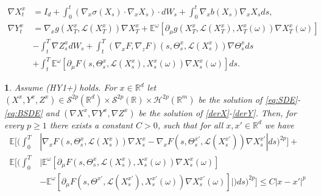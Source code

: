 \documentclass[10pt,a4paper]{amsart}
\newtheorem{lem}{}
\newcommand{\E}{\mathbb E}
\newcommand{\R}{\mathbb R}
\newcommand{\Te}{\Theta}
\newcommand{\cH}{\mathcal H}
\newcommand{\cL}{\mathcal L}
\newcommand{\cS}{\mathcal S}
\newcommand{\om}{\omega}
\newcommand{\si}{\sigma}
\begin{document}
\begin{align}\label{derX}
  \nabla X^x_t&=I_d+\int_0^t(\nabla_x\si(X_s)\cdot\nabla_xX_s)\cdot dW_s+\int_0^t\nabla_xb(X_s)\nabla_xX_sds,\\
  \label{derY}
\nabla Y^x_t&=\nabla_xg(X^x_T,\cL(X^x_T)) \nabla X^x_T+\E^\om[\partial_\mu g(X^x_T,\cL(X^x_T), X^x_T(\om))\nabla X^x_T(\om)]\\\nonumber
       &-\int_t^T\nabla Z^x_s dW_s+\int_t^T(\nabla_xF,\nabla_zF)(s,\Te^x_s,\cL(X^x_s)) \nabla\Te^x_sds\\
   \nonumber           \ &+\int_t^T\E^\om[\partial_\mu F(s,\Te^x_s,\cL(X^x_s), X^x_s(\om))\nabla X^x_s(\om)]ds.
\end{align}

\begin{lem}\label{driver}
  Assume (HY1+) holds. For $x\in\R^d$
let $(X^x,Y^x,Z^x)\in\cS^{2p}(\R^d)\times\cS^{2p}(\R)\times\cH^{2p}(\R^m)$
be the solution of \eqref{eq:SDE}-\eqref{eq:BSDE} and $(\nabla X^x,\nabla
Y^x,\nabla Z^x)$ be the solution of \eqref{derX}-\eqref{derY}.
Then, for every
$p\ge 1$ there exists a constant $C>0$, such that for all $x,x'\in\R^d$ we have
\begin{align*}
  \E\Big[\Big(\int_0^T&|\nabla_xF(s,\Te^x_s,\cL(X^x_s)) \nabla X^x_s
    -\nabla_xF(s,\Te_s ^{x'},\cL(X^{x'}_s)) \nabla X^{x'}_s|ds\Big)^{2p} \Big]+\\
\E\Big[\Big(\int_0^T&\big|\E^\om[\partial_\mu F(s,\Te^x_s,\cL(X^x_s), X^x_s(\om))\nabla X^x_s(\om)]
  \\&-\E^\om[\partial_\mu F(s,\Te^{x'},\cL(X^{x'}_s), X^{x'}_s(\om)) \nabla X^{x'}_s(\om)]\big|)ds\Big)^{2p}\Big]\le
C|x-x'|^p
\end{align*}
\end{lem}
\end{document}

